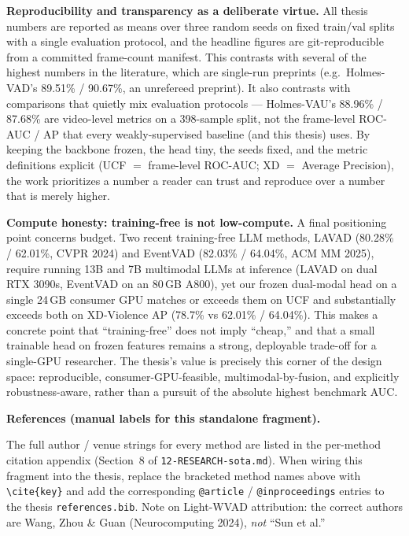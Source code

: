 \medskip\noindent\textbf{Reproducibility and transparency as a deliberate virtue.}
All thesis numbers are reported as means over three random seeds on fixed
train/val splits with a single evaluation protocol, and the headline figures are
git-reproducible from a committed frame-count manifest. This contrasts with
several of the highest numbers in the literature, which are single-run preprints
(e.g.\ Holmes-VAD's 89.51\% / 90.67\%, an unrefereed preprint).
It also contrasts with comparisons that quietly mix evaluation protocols ---
Holmes-VAU's 88.96\% / 87.68\% are video-level metrics on a 398-sample split,
not the frame-level ROC-AUC / AP that every weakly-supervised baseline (and this
thesis) uses. By keeping the backbone frozen, the head tiny, the seeds fixed,
and the metric definitions explicit (UCF $=$ frame-level ROC-AUC; XD $=$ Average
Precision), the work prioritizes a number a reader can trust and reproduce over
a number that is merely higher.

\medskip\noindent\textbf{Compute honesty: training-free is not low-compute.}
A final positioning point concerns budget. Two recent training-free LLM methods,
LAVAD (80.28\% / 62.01\%, CVPR 2024) and EventVAD (82.03\% / 64.04\%, ACM MM
2025), require running 13B and 7B multimodal LLMs at inference (LAVAD on dual
RTX 3090s, EventVAD on an 80\,GB A800), yet our frozen dual-modal head on a single
24\,GB consumer GPU matches or exceeds them on UCF and substantially exceeds both
on XD-Violence AP (78.7\% vs 62.01\% / 64.04\%). This makes a concrete point that
``training-free'' does not imply ``cheap,'' and that a small trainable head on
frozen features remains a strong, deployable trade-off for a single-GPU
researcher. The thesis's value is precisely this corner of the design space:
reproducible, consumer-GPU-feasible, multimodal-by-fusion, and explicitly
robustness-aware, rather than a pursuit of the absolute highest benchmark AUC.

\medskip

\noindent\textbf{\small References (manual labels for this standalone fragment).}
{\footnotesize\par\noindent
The full author / venue strings for every method are listed in the per-method
citation appendix (Section~8 of \texttt{12-RESEARCH-sota.md}). When wiring this
fragment into the thesis, replace the bracketed method names above with
\texttt{\textbackslash cite\{key\}} and add the corresponding \texttt{@article}
/ \texttt{@inproceedings} entries to the thesis \texttt{references.bib}.
Note on Light-WVAD attribution: the correct authors are Wang, Zhou \& Guan
(Neurocomputing 2024), \emph{not} ``Sun et al.''}



